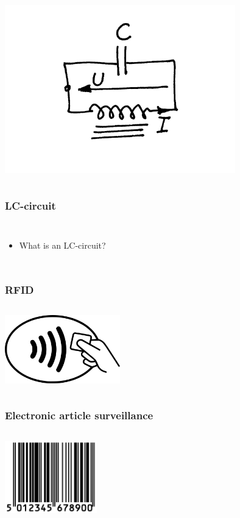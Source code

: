 \documentclass[aspectratio=1610]{beamer}
\begin{document}
\begin{frame}
\begin{columns}
\column{37em}
\hspace*{2cm}\includegraphics[width=10cm]{figs/Stromkrets.png}
\end{columns}
\end{frame}
\begin{frame}
\frametitle{LC-circuit}
\begin{columns}
\column{37em}
\begin{itemize}
    \item What is an LC-circuit?
\end{itemize}
\end{columns}
\end{frame}
\begin{frame}
\frametitle{RFID}
\begin{columns}
\column{37em}
\hspace*{5cm}\includegraphics[width=5cm]{figs/rfid.png}
\end{columns}
\end{frame}
\begin{frame}
\frametitle{Electronic article surveillance}
\begin{columns}
\column{37em}
\hspace*{5cm}\includegraphics[width=4cm]{figs/barcode.png}
\end{columns}
\end{frame}
\end{document}
